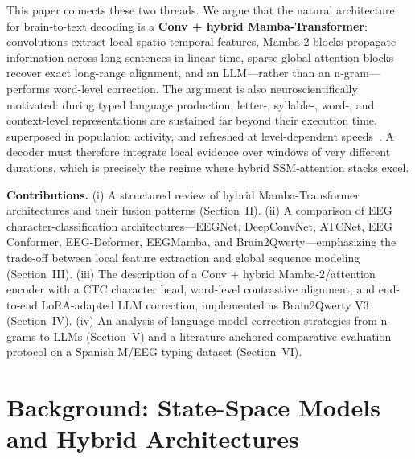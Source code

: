 \documentclass[conference]{IEEEtran}
\begin{document}
This paper connects these two threads. We argue that the natural
architecture for brain-to-text decoding is a \textbf{Conv + hybrid
Mamba-Transformer}: convolutions extract local spatio-temporal features,
Mamba-2 blocks propagate information across long sentences in linear time,
sparse global attention blocks recover exact long-range alignment, and an
LLM---rather than an n-gram---performs word-level correction. The argument
is also neuroscientifically motivated: during typed language production,
letter-, syllable-, word-, and context-level representations are sustained
far beyond their execution time, superposed in population activity, and
refreshed at level-dependent speeds~\cite{zhang2025hierarchy}. A decoder
must therefore integrate local evidence over windows of very different
durations, which is precisely the regime where hybrid SSM-attention stacks
excel.

\textbf{Contributions.} (i) A structured review of hybrid Mamba-Transformer
architectures and their fusion patterns (Section~II). (ii) A comparison of
EEG character-classification architectures---EEGNet, DeepConvNet, ATCNet,
EEG Conformer, EEG-Deformer, EEGMamba, and Brain2Qwerty---emphasizing the
trade-off between local feature extraction and global sequence modeling
(Section~III). (iii) The description of a Conv + hybrid Mamba-2/attention
encoder with a CTC character head, word-level contrastive alignment, and
end-to-end LoRA-adapted LLM correction, implemented as Brain2Qwerty V3
(Section~IV). (iv) An analysis of language-model correction strategies from
n-grams to LLMs (Section~V) and a literature-anchored comparative evaluation
protocol on a Spanish M/EEG typing dataset (Section~VI).

\section{Background: State-Space Models and Hybrid Architectures}
\end{document}
